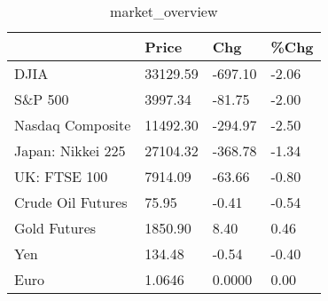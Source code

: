 \documentclass{article}%
\begin{document}
%


\begin{table}[htbp]%
\caption{market\_overview}%
\centering%
\begin{adjustbox}{width=1\textwidth}%
\begin{tabular}{llll}
\toprule
                  &    Price &     Chg &  \%Chg \\
\midrule
             DJIA & 33129.59 & -697.10 & -2.06 \\
          S\&P 500 &  3997.34 &  -81.75 & -2.00 \\
 Nasdaq Composite & 11492.30 & -294.97 & -2.50 \\
Japan: Nikkei 225 & 27104.32 & -368.78 & -1.34 \\
     UK: FTSE 100 &  7914.09 &  -63.66 & -0.80 \\
Crude Oil Futures &    75.95 &   -0.41 & -0.54 \\
     Gold Futures &  1850.90 &    8.40 &  0.46 \\
              Yen &   134.48 &   -0.54 & -0.40 \\
             Euro &   1.0646 &  0.0000 &  0.00 \\
\bottomrule
\end{tabular}
%
\end{adjustbox}%
\end{table}

%
\end{document}
